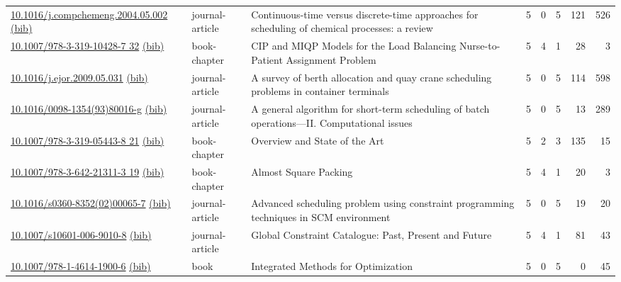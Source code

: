 {\begin{longtable}{p{5cm}lp{11cm}rrrrr}
\href{http://dx.doi.org/10.1016/j.compchemeng.2004.05.002}{10.1016/j.compchemeng.2004.05.002} \href{https://www.doi2bib.org/bib/10.1016/j.compchemeng.2004.05.002}{(bib)} & journal-article & Continuous-time versus discrete-time approaches for scheduling of chemical processes: a review & 5 & 0 & 5 & 121 & 526 \\
\href{http://dx.doi.org/10.1007/978-3-319-10428-7_32}{10.1007/978-3-319-10428-7 32} \href{https://www.doi2bib.org/bib/10.1007/978-3-319-10428-7_32}{(bib)} & book-chapter & CIP and MIQP Models for the Load Balancing Nurse-to-Patient Assignment Problem & 5 & 4 & 1 & 28 & 3 \\
\href{http://dx.doi.org/10.1016/j.ejor.2009.05.031}{10.1016/j.ejor.2009.05.031} \href{https://www.doi2bib.org/bib/10.1016/j.ejor.2009.05.031}{(bib)} & journal-article & A survey of berth allocation and quay crane scheduling problems in container terminals & 5 & 0 & 5 & 114 & 598 \\
\href{http://dx.doi.org/10.1016/0098-1354(93)80016-g}{10.1016/0098-1354(93)80016-g} \href{https://www.doi2bib.org/bib/10.1016/0098-1354(93)80016-g}{(bib)} & journal-article & A general algorithm for short-term scheduling of batch operations—II. Computational issues & 5 & 0 & 5 & 13 & 289 \\
\href{http://dx.doi.org/10.1007/978-3-319-05443-8_21}{10.1007/978-3-319-05443-8 21} \href{https://www.doi2bib.org/bib/10.1007/978-3-319-05443-8_21}{(bib)} & book-chapter & Overview and State of the Art & 5 & 2 & 3 & 135 & 15 \\
\href{http://dx.doi.org/10.1007/978-3-642-21311-3_19}{10.1007/978-3-642-21311-3 19} \href{https://www.doi2bib.org/bib/10.1007/978-3-642-21311-3_19}{(bib)} & book-chapter & Almost Square Packing & 5 & 4 & 1 & 20 & 3 \\
\href{http://dx.doi.org/10.1016/s0360-8352(02)00065-7}{10.1016/s0360-8352(02)00065-7} \href{https://www.doi2bib.org/bib/10.1016/s0360-8352(02)00065-7}{(bib)} & journal-article & Advanced scheduling problem using constraint programming techniques in SCM environment & 5 & 0 & 5 & 19 & 20 \\
\href{http://dx.doi.org/10.1007/s10601-006-9010-8}{10.1007/s10601-006-9010-8} \href{https://www.doi2bib.org/bib/10.1007/s10601-006-9010-8}{(bib)} & journal-article & Global Constraint Catalogue: Past, Present and Future & 5 & 4 & 1 & 81 & 43 \\
\href{http://dx.doi.org/10.1007/978-1-4614-1900-6}{10.1007/978-1-4614-1900-6} \href{https://www.doi2bib.org/bib/10.1007/978-1-4614-1900-6}{(bib)} & book & Integrated Methods for Optimization & 5 & 0 & 5 & 0 & 45 \\

\end{longtable}}
